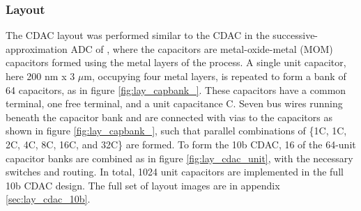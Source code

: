 		\subsubsection{Layout}
		The CDAC layout was performed similar to the CDAC in the successive-approximation ADC of \cite{Wulff2017}, where the capacitors are metal-oxide-metal (MOM) capacitors formed using the metal layers of the process. A single unit capacitor, here 200 nm x 3 $\mu$m, occupying four metal layers, is repeated to form a bank of 64 capacitors, as in figure \ref{fig:lay_capbank_}. These capacitors have a common terminal, one free terminal, and a unit capacitance C. Seven bus wires running beneath the capacitor bank and are connected with vias to the capacitors as shown in figure \ref{fig:lay_capbank_}, such that parallel combinations of \{1C, 1C, 2C, 4C, 8C, 16C, and 32C\} are formed. To form the 10b CDAC, 16 of the 64-unit capacitor banks are combined as in figure \ref{fig:lay_cdac_unit}, with the necessary switches and routing. In total, 1024 unit capacitors are implemented in the full 10b CDAC design. The full set of layout images are in appendix \ref{sec:lay_cdac_10b}.
